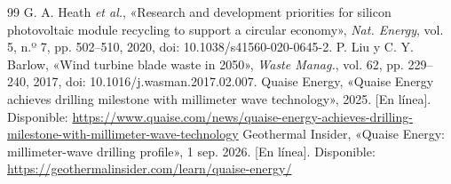 \documentclass[journal,letterpaper]{IEEEtran}
\begin{document}
\begin{thebibliography}{99}
 G. A. Heath \emph{et al.}, «Research and development priorities for silicon photovoltaic module recycling to support a circular economy», \emph{Nat. Energy}, vol. 5, n.º 7, pp. 502--510, 2020, doi: 10.1038/s41560-020-0645-2.
 P. Liu y C. Y. Barlow, «Wind turbine blade waste in 2050», \emph{Waste Manag.}, vol. 62, pp. 229--240, 2017, doi: 10.1016/j.wasman.2017.02.007.
 Quaise Energy, «Quaise Energy achieves drilling milestone with millimeter wave technology», 2025. [En línea]. Disponible: \url{https://www.quaise.com/news/quaise-energy-achieves-drilling-milestone-with-millimeter-wave-technology}
 Geothermal Insider, «Quaise Energy: millimeter-wave drilling profile», 1 sep. 2026. [En línea]. Disponible: \url{https://geothermalinsider.com/learn/quaise-energy/}
\end{thebibliography}
\end{document}
